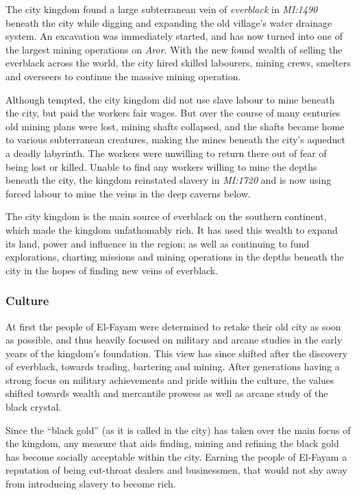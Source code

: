 The city kingdom found a large subterranean vein of \emph{everblack} in
\emph{MI:1490} beneath the city while digging and expanding the old village's
water drainage system. An excavation was immediately started, and has now
turned into one of the largest mining operations on \emph{Aror}. With the new
found wealth of selling the everblack across the world, the city hired skilled
labourers, mining crews, smelters and overseers to continue the massive mining
operation.

Although tempted, the city kingdom did not use slave labour to mine beneath
the city, but paid the workers fair wages. But over the course of many
centuries old mining plans were lost, mining shafts collapsed, and the shafts
became home to various subterranean creatures, making the mines beneath the
city's aqueduct a deadly labyrinth. The workers were unwilling to return
there out of fear of being lost or killed. Unable to find any workers willing
to mine the depths beneath the city, the kingdom reinstated slavery in
\emph{MI:1720} and is now using forced labour to mine the veins in the deep
caverns below.

The city kingdom is the main source of everblack on the southern continent,
which made the kingdom unfathomably rich. It has used this wealth to expand
its land, power and influence in the region; as well as continuing to fund
explorations, charting missions and mining operations in the depths beneath
the city in the hopes of finding new veins of everblack.

\subsubsection*{Culture}

At first the people of El-Fayam were determined to retake their old city as
soon as possible, and thus heavily focused on military and arcane studies in
the early years of the kingdom's foundation. This view has since shifted after
the discovery of everblack, towards trading, bartering and mining. After
generations having a strong focus on military achievements and pride within
the culture, the values shifted towards wealth and mercantile prowess as well
as arcane study of the black crystal.

Since the ``black gold'' (as it is called in the city) has taken over the main
focus of the kingdom, any measure that aids finding, mining and refining the
black gold has become socially acceptable within the city. Earning the people
of El-Fayam a reputation of being cut-throat dealers and businessmen, that
would not shy away from introducing slavery to become rich.

